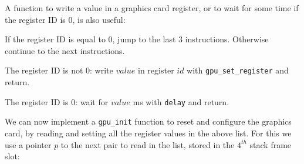 A function to write a value in a graphics card register, or to wait for some
time if the register ID is 0, is also useful:

\begin{Paragraph}
\begin{paracol}{2}

If the register ID is equal to 0, jump to the last 3 instructions.
Otherwise continue to the next instructions.


The register ID is not 0: write $value$ in register $id$ with
\verb!gpu_set_register! and return.


The register ID is 0: wait for $value$ ms with \verb!delay! and return.

\end{paracol}
\end{Paragraph}

We can now implement a \verb!gpu_init! function to reset and configure the
graphics card, by reading and setting all the register values in the above
list. For this we use a pointer $p$ to the next pair to read in the list,
stored in the $4^{th}$ stack frame slot:\bigskip

